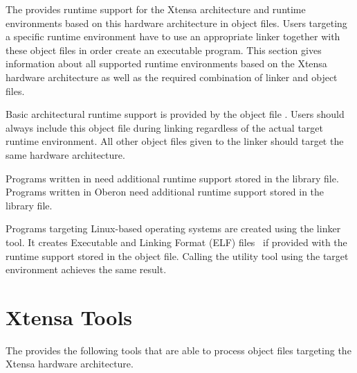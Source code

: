 The \ecs{} provides runtime support for the Xtensa architecture and runtime environments based on this hardware architecture in object files.
Users targeting a specific runtime environment have to use an appropriate linker together with these object files in order create an executable program.
This section gives information about all supported runtime environments based on the Xtensa hardware architecture as well as the required combination of linker and object files.

Basic architectural runtime support is provided by the object file .
Users should always include this object file during linking regardless of the actual target runtime environment.
All other object files given to the linker should target the same hardware architecture.

Programs written in \cpp{} need additional runtime support stored in the  library file.
Programs written in Oberon need additional runtime support stored in the  library file.
\seecpp\seeoberon

Programs targeting Linux-based operating systems are created using the  linker tool.
It creates Executable and Linking Format (ELF) files~\cite{elffile} if provided with the runtime support stored in the  object file.
Calling the  utility tool using the  target environment achieves the same result.

\section{Xtensa Tools}

The \ecs{} provides the following tools that are able to process object files targeting the Xtensa hardware architecture.
\interface

\cdxtensa
\cppxtensa
\falxtensa
\obxtensa
\xtensaasm
\xtensadism
\linkbin

\concludechapter
